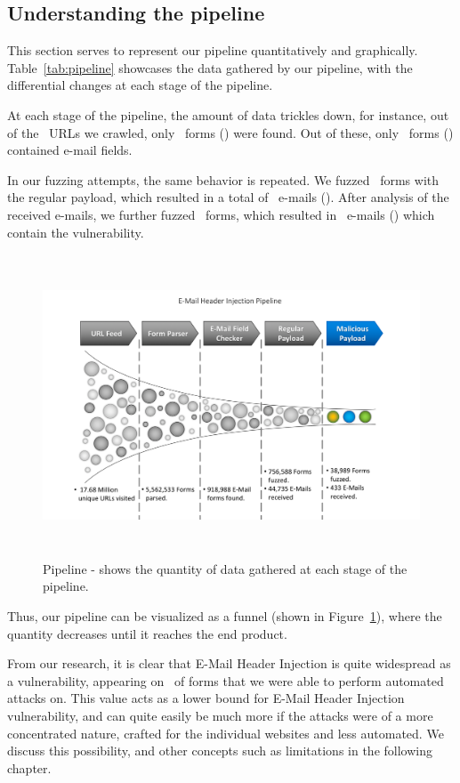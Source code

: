 \subsection[The Pipeline]{Understanding the pipeline}
This section serves to represent our pipeline quantitatively and graphically. Table~\ref{tab:pipeline} showcases the data gathered by our pipeline, with the differential changes at each stage of the pipeline. 

At each stage of the pipeline, the amount of data trickles down, for instance, out of the \urls\ URLs we crawled, only \forms\ forms (\formsDelta) were found. Out of these, only \emailforms\ forms (\emailformsDelta) contained e-mail fields.

In our fuzzing attempts, the same behavior is repeated. We fuzzed \fuzzed\ forms with the regular payload, which resulted in a total of \recd\ e-mails (\recdDelta). After analysis of the received e-mails, we further fuzzed \fuzzed\ forms, which resulted in \success\ e-mails (\successDelta) which contain the vulnerability.


\begin{figure}
	\centering
	\includegraphics[width=16cm, height=9cm]{Results/emailheaderpipeline}
	\caption[]{Pipeline - shows the quantity of data gathered at each stage of the pipeline.}
	\label{fig:pipeline}
\end{figure}

Thus, our pipeline can be visualized as a funnel (shown in Figure~\ref{fig:pipeline}), where the quantity decreases until it reaches the end product.

From our research, it is clear that E-Mail Header Injection is quite widespread as a vulnerability, appearing on \successDelta\ of forms that we were able to perform automated attacks on. This value acts as a lower bound for E-Mail Header Injection vulnerability, and can quite easily be much more if the attacks were of a more concentrated nature, crafted for the individual websites and less automated. We discuss this possibility, and other concepts such as limitations in the following chapter.